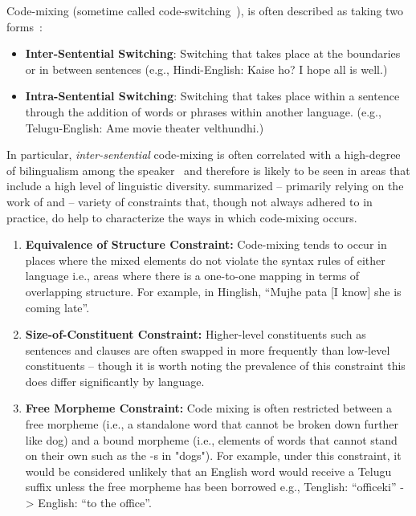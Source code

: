 Code-mixing (sometime called
code-switching~\cite{gardner-chloros_code-switching_2009}), is often described
as taking two forms~\cite{thara_code-mixing_2018,
berk-seligson_linguistic_1986}:
\begin{itemize}
    \item \textbf{Inter-Sentential Switching}: Switching that takes place at the boundaries or in between sentences (e.g., Hindi-English: Kaise ho? I hope all is well.)
    \item \textbf{Intra-Sentential Switching}: Switching that takes place within a sentence through the addition of words or phrases within another language. (e.g., Telugu-English: Ame movie theater velthundhi.)
\end{itemize}
In particular, \textit{inter-sentential} code-mixing is often correlated with a
high-degree of bilingualism among the speaker~\cite{heller_8_1988,
pfaff_constraints_1979, zentella_integrating_1990}
and therefore is likely to be seen in areas that include a high level of
linguistic diversity. \citet{berk-seligson_linguistic_1986} summarized -- primarily relying on the work of \citet{pfaff_constraints_1979} and \citet{poplack_sometimes_1980} -- variety
of constraints that, though not always adhered to in practice, do help to
characterize the ways in which code-mixing occurs.
\begin{enumerate}
    \item \textbf{Equivalence of Structure Constraint:} Code-mixing tends to
    occur in places where the mixed elements do not violate the syntax rules of
    either language i.e., areas where there is a one-to-one mapping in terms of
    overlapping structure. For example, in Hinglish, ``Mujhe pata [I know] she
    is coming late''.
    \item \textbf{Size-of-Constituent Constraint:} Higher-level constituents
    such as sentences and clauses are often swapped in more frequently than
    low-level constituents -- though it is worth noting the prevalence
    of this constraint this does differ significantly by language. 
    \item \textbf{Free Morpheme Constraint:} Code mixing is often restricted
    between a free morpheme (i.e., a standalone word that cannot be broken down
    further like dog) and a bound morpheme (i.e., elements of words that cannot
    stand on their own such as the -s in "dogs"). For example, under this
    constraint, it would be considered unlikely that an English word would
    receive a Telugu suffix unless the free morpheme has been borrowed e.g.,
    Tenglish: ``officeki'' -> English: ``to the office''.
\end{enumerate}

